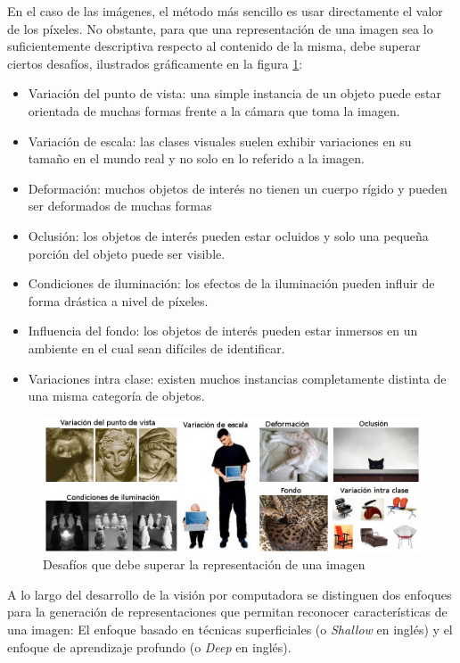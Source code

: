 \documentclass[a4paper,11pt,spanish]{book}
\begin{document}
      En el caso de las imágenes, el método más sencillo es usar directamente el valor de los píxeles. 
      No obstante, para que una representación de una imagen sea lo suficientemente descriptiva respecto al contenido de la misma, debe superar ciertos desafíos, 
      ilustrados gráficamente en la figura \ref{fig:stanford_challenges}:
      
      \begin{itemize}
	\item Variación del punto de vista: una simple instancia de un objeto puede estar orientada de muchas formas frente a la cámara que toma la imagen.
	\item Variación de escala: las clases visuales suelen exhibir variaciones en su tamaño en el mundo real y no solo en lo referido a la imagen.
	\item Deformación: muchos objetos de interés no tienen un cuerpo rígido y pueden ser deformados de muchas formas
	\item Oclusión: los objetos de interés pueden estar ocluidos y solo una pequeña porción del objeto puede ser visible.
	\item Condiciones de iluminación: los efectos de la iluminación pueden influir de forma drástica a nivel de píxeles.
	\item Influencia del fondo: los objetos de interés pueden estar inmersos en un ambiente en el cual sean difíciles de identificar.
	\item Variaciones intra clase: existen muchos instancias completamente distinta de una misma categoría de objetos.
      \end{itemize}
      
      \begin{figure}[h]
	\includegraphics[scale=0.5]{./img/stanford_challenges_spanish.jpeg}
	\caption{Desafíos que debe superar la representación de una imagen}
	\label{fig:stanford_challenges}
      \end{figure}

      A lo largo del desarrollo de la visión por computadora se distinguen dos enfoques para la generación de representaciones que permitan reconocer características 
      de una imagen: El enfoque basado en técnicas superficiales (o \emph{Shallow} en inglés) y el enfoque de aprendizaje profundo (o \emph{Deep} en inglés).
\end{document}
